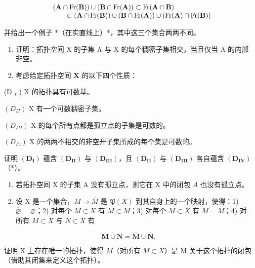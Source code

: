 \[
\begin{array}{r l} & (\mathbf {A} \cap \operatorname{Fr} (\mathbf {B})) \cup (\mathbf {B} \cap \operatorname{Fr} (\mathbf {A})) \subset \operatorname{Fr} (\mathbf {A} \cap \mathbf {B}) \\ & \qquad \subset (\mathbf {A} \cap \operatorname{Fr} (\mathbf {B})) \cup (\mathbf {B} \cap \operatorname{Fr} (\mathbf {A})) \cup (\operatorname{Fr} (\mathbf {A}) \cap \operatorname{Fr} (\mathbf {B})) \end{array}
\]

并给出一个例子 *（在实直线上）*，其中这三个集合两两不同。

\begin{enumerate}
\def\labelenumi{\arabic{enumi})}
\setcounter{enumi}{5}
\item
  证明：拓扑空间 X 的子集 A 与 X 的每个稠密子集相交，当且仅当 A 的内部非空。
\item
  考虑给定拓扑空间 \(\mathbf{X}\) 的以下四个性质：
\end{enumerate}

(D \(_{I}\) ) X 的拓扑具有可数基。

\((D_{II})\) X 有一个可数稠密子集。

\((D_{III})\) X 的每个所有点都是孤立点的子集是可数的。

\((D_{IV})\) X 的两两不相交的非空开子集所成的每个集是可数的。

证明 \((\mathbf{D}_{\mathbf{I}})\) 蕴含 \((\mathbf{D}_{\mathbf{II}})\) 与 \((\mathbf{D}_{\mathbf{III}})\)，且 \((\mathbf{D}_{\mathbf{II}})\) 与 \((\mathbf{D}_{\mathbf{III}})\) 各自蕴含 \((\mathbf{D}_{\mathbf{IV}})\)（*）。

\begin{enumerate}
\def\labelenumi{\arabic{enumi})}
\setcounter{enumi}{7}
\item
  若拓扑空间 X 的子集 A 没有孤立点，则它在 X 中的闭包 \(\overline{A}\) 也没有孤立点。
\item
  设 X 是一个集合，\(M \to \overline{M}\) 是 \(\mathfrak{P}(X)\) 到其自身上的一个映射，使得：1) \(\overline{\varnothing} = \varnothing\)；2) 对每个 \(M \subset X\) 有 \(M \subset \overline{M}\)；3) 对每个 \(M \subset X\) 有 \(\overline{M} = \overline{M}\)；4) 对所有 \(M \subset X\) 与 \(N \subset X\) 有
\end{enumerate}

\[
\overline {{\mathbf {M} \cup \mathbf {N}}} = \overline {{\mathbf {M}}} \cup \overline {{\mathbf {N}}}.
\]

证明 X 上存在唯一的拓扑，使得 \(\overline{M}\)（对所有 \(M \subset X\)）是 M 关于这个拓扑的闭包（借助其闭集来定义这个拓扑）。

